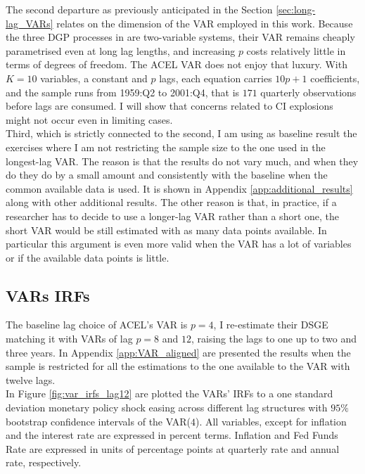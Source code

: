 \documentclass[12pt, a4paper]{article}
\begin{document}
The second departure as previously anticipated in the Section \ref{sec:long-lag_VARs} relates on the dimension of 
the VAR employed in this work.
Because the three DGP processes in \citet{Long_Lag2025} are two-variable systems, their VAR remains cheaply 
parametrised even at long lag lengths, and increasing $p$ costs relatively little in terms of degrees of freedom.
The ACEL VAR does not enjoy that luxury. With $K = 10$ variables, a constant and $p$ lags, each equation carries 
$10p + 1$ coefficients, and the sample runs from 1959:Q2 to 2001:Q4, that is $171$ quarterly observations 
before lags are consumed. I will show that concerns related to CI explosions might not occur even in limiting cases.
\\

Third, which is strictly connected to the second, I am using as baseline result the exercises where I am not 
restricting the sample size to the one used in the longest-lag VAR.
The reason is that the results do not vary much, and when they do they do by a small amount and consistently 
with the baseline when the common available data is used. It is shown in Appendix \ref{app:additional_results} along with other additional results.
The other reason is that, in practice, if a researcher has to decide to use a longer-lag VAR rather than a short one, 
the short VAR would be still estimated with as many data points available. 
In particular this argument is even more valid when the VAR has a lot of variables or if the available data 
points is little.

\subsection{VARs IRFs}
\label{sec:results_VARs_IRFs}
The baseline lag choice of ACEL's VAR is $p = 4$, I re-estimate their DSGE matching it with VARs of 
lag $p = 8$ and $12$, raising the lags to one up to two and three years. In Appendix \ref{app:VAR_aligned} 
are presented the results when the sample is restricted for all the estimations to the one available 
to the VAR with twelve lags.
\\


In Figure \ref{fig:var_irfs_lag12} are plotted the VARs' IRFs to a one standard deviation monetary 
policy shock easing across different lag structures with $95\%$ bootstrap confidence intervals of the VAR($4$).
All variables, except for inflation and the interest rate are expressed in percent terms.
Inflation and Fed Funds Rate are expressed in units of percentage points at quarterly rate and annual rate, respectively.
\end{document}
